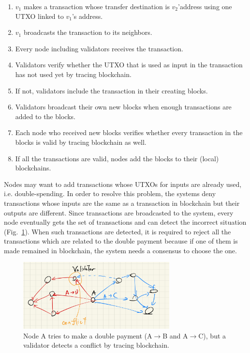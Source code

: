 \documentclass[a4j,11pt,uplatex,twocolumn]{article}
\begin{document}
\begin{enumerate}
    \item $v_1$ makes a transaction whose transfer destination is $v_2$'address using one UTXO linked to $v_1$'s address.
    \item $v_1$ broadcasts the transaction to its neighbors.
    \item Every node including validators receives the transaction.
    \item Validators verify whether the UTXO that is used as input in the transaction has not used yet by tracing blockchain.
    \item If not, validators include the transaction in their creating blocks.
    \item Validators broadcast their own new blocks when enough transactions are added to the blocks.
    \item Each node who received new blocks verifies whether every transaction in the blocks is valid by tracing blockchain as well.
    \item If all the transactions are valid, nodes add the blocks to their (local) blockchains.
\end{enumerate}

Nodes may want to add transactions whose UTXOs for inputs are already used, i.e. double-spending.
In order to resolve this problem, the systems deny transactions whose inputs are the same as a transaction in blockchain but their outputs are different.
Since transactions are broadcasted to the system, every node eventually gets the set of transactions and can detect the incorrect situation (Fig.~\ref{fig:conflict}).
When such transactions are detected, it is required to reject all the transactions which are related to the double payment because if one of them is made remained in blockchain, the system needs a consensus to choose the one.
\begin{figure}[tbp]
    \begin{center}
        \includegraphics[width=8.0cm]{./fig/conflict.jpeg}
        \caption{Node A tries to make a double payment (A$\rightarrow$B and A$\rightarrow$C), but a validator detects a conflict by tracing blockchain.}
        \label{fig:conflict}
    \end{center}
\end{figure}
\end{document}
